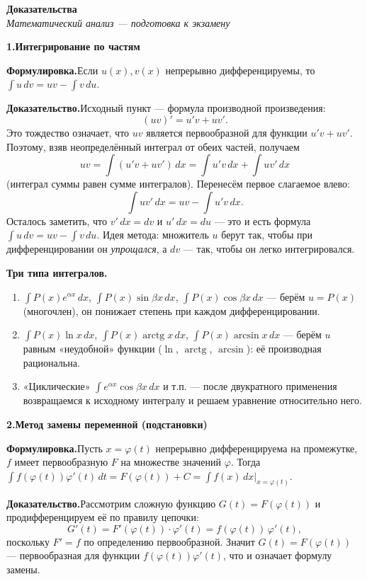 \documentclass[10pt,a4paper]{article}
\newcommand{\coursename}{Математический анализ — подготовка к экзамену}
\newcommand{\doctitle}{Доказательства}
\DeclareMathOperator{\arctg}{arctg}
\newcommand{\dx}{\,dx}
\newcommand{\dt}{\,dt}
\theoremstyle{definition}
\theoremstyle{plain}
\newcommand{\writespace}{\vspace{7.5mm}}
\newcommand{\prf}[2]{%
  \par\writespace\noindent
  {\large\bfseries\color{accent}#1.\enspace #2}\par\smallskip}
\newcommand{\stmt}{\par\noindent\textbf{Формулировка.}\enspace}
\newcommand{\dok}{\par\noindent\textbf{Доказательство.}\enspace}
\begin{document}
\begin{center}
  {\LARGE\bfseries \doctitle}\\[3pt]
  {\large\itshape \coursename}
\end{center}
\vspace{4pt}

\prf{1}{Интегрирование по частям}
\stmt Если $u(x),v(x)$ непрерывно дифференцируемы, то
$\displaystyle\int u\,dv=uv-\int v\,du$.

\dok Исходный пункт — формула производной произведения:
\[
  (uv)'=u'v+uv'.
\]
Это тождество означает, что $uv$ является первообразной для функции $u'v+uv'$. Поэтому, взяв
неопределённый интеграл от обеих частей, получаем
\[
  uv=\int (u'v+uv')\dx=\int u'v\dx+\int uv'\dx
\]
(интеграл суммы равен сумме интегралов). Перенесём первое слагаемое влево:
\[
  \int uv'\dx=uv-\int u'v\dx .
\]
Осталось заметить, что $v'\dx=dv$ и $u'\dx=du$ — это и есть формула $\int u\,dv=uv-\int v\,du$.
Идея метода: множитель $u$ берут так, чтобы при дифференцировании он \emph{упрощался}, а $dv$ —
так, чтобы он легко интегрировался.

\smallskip
\noindent\textbf{Три типа интегралов.}
\begin{enumerate}[label=\arabic*),leftmargin=*,nosep]
  \item $\int P(x)e^{\alpha x}\dx$, $\int P(x)\sin\beta x\dx$, $\int P(x)\cos\beta x\dx$ — берём
        $u=P(x)$ (многочлен), он понижает степень при каждом дифференцировании.
  \item $\int P(x)\ln x\dx$, $\int P(x)\arctg x\dx$, $\int P(x)\arcsin x\dx$ — берём $u$ равным
        «неудобной» функции ($\ln$, $\arctg$, $\arcsin$): её производная рациональна.
  \item «Циклические» $\int e^{\alpha x}\cos\beta x\dx$ и т.п. — после двукратного применения
        возвращаемся к исходному интегралу и решаем уравнение относительно него.
\end{enumerate}

\prf{2}{Метод замены переменной (подстановки)}
\stmt Пусть $x=\varphi(t)$ непрерывно дифференцируема на промежутке, $f$ имеет первообразную $F$
на множестве значений $\varphi$. Тогда
$\displaystyle\int f(\varphi(t))\varphi'(t)\dt=F(\varphi(t))+C=\int f(x)\dx\Big|_{x=\varphi(t)}$.

\dok Рассмотрим сложную функцию $G(t)=F(\varphi(t))$ и продифференцируем её по правилу цепочки:
\[
  G'(t)=F'(\varphi(t))\cdot\varphi'(t)=f(\varphi(t))\,\varphi'(t),
\]
поскольку $F'=f$ по определению первообразной. Значит $G(t)=F(\varphi(t))$ — первообразная для
функции $f(\varphi(t))\varphi'(t)$, что и означает формулу замены.
\end{document}
